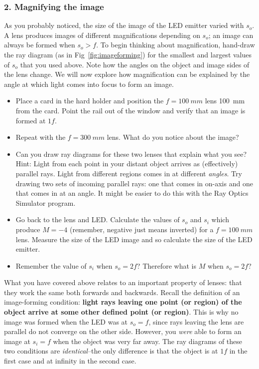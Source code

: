 \documentclass[a4paper]{report}
\begin{document}
\subsubsection{2. Magnifying the image}
As you probably noticed, the size of the image of the LED emitter varied with $s_o$.
A lens produces images of different magnifications depending on $s_o$; an image can always be formed when $s_o>f$. 
To begin thinking about magnification, hand-draw the ray diagram (as in Fig~\ref{fig:imageforming}) for the smallest and largest values of $s_o$ that you used above. 
Note how the angles on the object and image sides of the lens change.
We will now explore how magnification can be explained by the angle at which light comes into focus to form an image. 

\begin{itemize}
\item Place a card in the hard holder and position the $f=100~mm$ lens 100~mm from the card. 
Point the rail out of the window and verify that an image is formed at $1f$. 
\item Repeat with the $f=300~mm$ lens. What do you notice about the image? 
\item Can you draw ray diagrams for these two lenses that explain what you see?
Hint: Light from each point in your distant object arrives as (effectively) parallel rays. 
Light from different regions comes in at different \textit{angles}. 
Try drawing two sets of incoming parallel rays: one that comes in on-axis and one that comes in at an angle. 
It might be easier to do this with the Ray Optics Simulator program.
\item Go back to the lens and LED.
Calculate the values of $s_o$ and $s_i$ which produce $M=-4$ (remember, negative just means inverted) for a $f=100~mm$ lens. 
Measure the size of the LED image and so calculate the size of the LED emitter. 
\item Remember the value of $s_i$ when $s_o=2f$? Therefore what is $M$ when $s_o=2f$?
\end{itemize}

What you have covered above relates to an important property of lenses: that they work the same both forwards and backwards.
Recall the definition of an image-forming condition: \textbf{light rays leaving one point (or region) of the object arrive at some other defined point (or region)}.
This is why no image was formed when the LED was at $s_o=f$, since rays leaving the lens are parallel do not converge on the other side. 
However, you \textit{were} able to form an image at $s_i=f$ when the object was very far away. 
The ray diagrams of these two conditions are \textit{identical}--the only difference is that the object is at $1f$ in the first case and at infinity in the second case.
\end{document}
